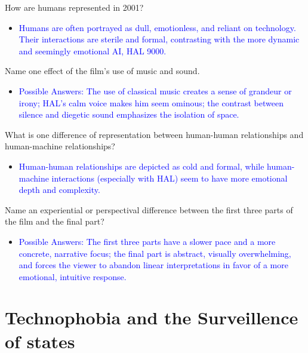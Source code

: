 \documentclass[11pt,fleqn]{book}
\begin{document}
\begin{exercise}
How are humans represented in 2001?
\begin{itemize}
\item \textcolor{blue}{Humans are often portrayed as dull, emotionless, and reliant on technology.  Their interactions are sterile and formal, contrasting  with the more dynamic and seemingly emotional AI, HAL 9000.}
\end{itemize}
\end{exercise}

\begin{exercise}
Name one effect of the film's use of music and sound.
\begin{itemize}
\item \textcolor{blue}{Possible Answers: The use of classical music creates a sense of grandeur or irony; HAL's calm voice makes him seem  ominous; the contrast between silence and diegetic sound emphasizes the isolation of space.}
\end{itemize}
\end{exercise}

\begin{exercise}
What is one difference of representation between human-human relationships and human-machine relationships?
\begin{itemize}
\item \textcolor{blue}{Human-human relationships are depicted as cold and formal, while human-machine interactions (especially with HAL) seem to have more emotional depth and complexity.}
\end{itemize}
\end{exercise}

\begin{exercise}
Name an experiential or perspectival difference between the first three parts of the film and the final part?
\begin{itemize}
\item \textcolor{blue}{Possible Answers:  The first three parts have a slower pace and a more concrete, narrative focus;  the final part is abstract, visually overwhelming, and forces the viewer to abandon linear interpretations in favor of  a more emotional, intuitive response.}
\end{itemize}
\end{exercise}



\section{Technophobia and the Surveillence of states}
\end{document}
